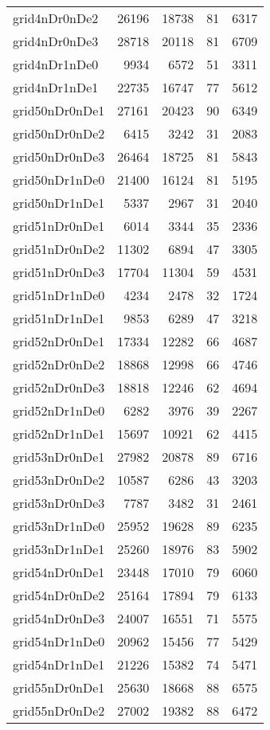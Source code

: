 \begin{longtable}{lrrrr}
grid4nDr0nDe2 & 26196 & 18738 & 81 & 6317 \\
grid4nDr0nDe3 & 28718 & 20118 & 81 & 6709 \\
grid4nDr1nDe0 & 9934 & 6572 & 51 & 3311 \\
grid4nDr1nDe1 & 22735 & 16747 & 77 & 5612 \\
grid50nDr0nDe1 & 27161 & 20423 & 90 & 6349 \\
grid50nDr0nDe2 & 6415 & 3242 & 31 & 2083 \\
grid50nDr0nDe3 & 26464 & 18725 & 81 & 5843 \\
grid50nDr1nDe0 & 21400 & 16124 & 81 & 5195 \\
grid50nDr1nDe1 & 5337 & 2967 & 31 & 2040 \\
grid51nDr0nDe1 & 6014 & 3344 & 35 & 2336 \\
grid51nDr0nDe2 & 11302 & 6894 & 47 & 3305 \\
grid51nDr0nDe3 & 17704 & 11304 & 59 & 4531 \\
grid51nDr1nDe0 & 4234 & 2478 & 32 & 1724 \\
grid51nDr1nDe1 & 9853 & 6289 & 47 & 3218 \\
grid52nDr0nDe1 & 17334 & 12282 & 66 & 4687 \\
grid52nDr0nDe2 & 18868 & 12998 & 66 & 4746 \\
grid52nDr0nDe3 & 18818 & 12246 & 62 & 4694 \\
grid52nDr1nDe0 & 6282 & 3976 & 39 & 2267 \\
grid52nDr1nDe1 & 15697 & 10921 & 62 & 4415 \\
grid53nDr0nDe1 & 27982 & 20878 & 89 & 6716 \\
grid53nDr0nDe2 & 10587 & 6286 & 43 & 3203 \\
grid53nDr0nDe3 & 7787 & 3482 & 31 & 2461 \\
grid53nDr1nDe0 & 25952 & 19628 & 89 & 6235 \\
grid53nDr1nDe1 & 25260 & 18976 & 83 & 5902 \\
grid54nDr0nDe1 & 23448 & 17010 & 79 & 6060 \\
grid54nDr0nDe2 & 25164 & 17894 & 79 & 6133 \\
grid54nDr0nDe3 & 24007 & 16551 & 71 & 5575 \\
grid54nDr1nDe0 & 20962 & 15456 & 77 & 5429 \\
grid54nDr1nDe1 & 21226 & 15382 & 74 & 5471 \\
grid55nDr0nDe1 & 25630 & 18668 & 88 & 6575 \\
grid55nDr0nDe2 & 27002 & 19382 & 88 & 6472 \\

\end{longtable}
